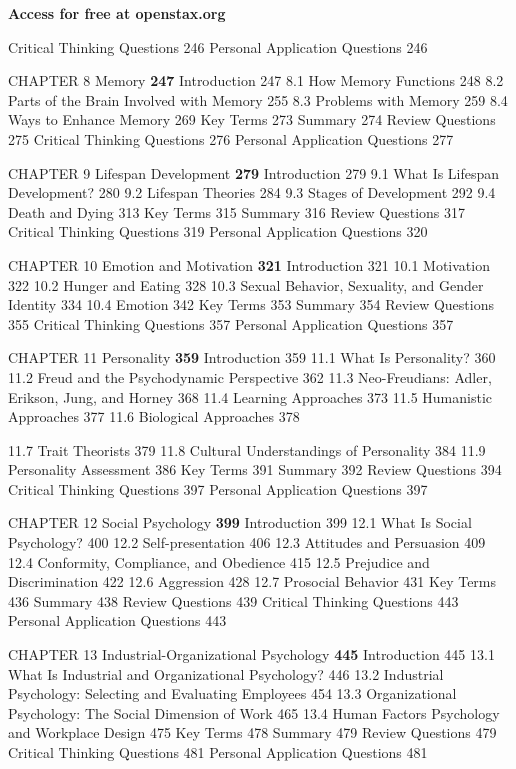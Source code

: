 \documentclass[11pt]{article}
\begin{document}
\textbf{Access for free at openstax.org}



Critical Thinking Questions  246  Personal Application Questions  246

CHAPTER 8  Memory \textbf{247 } Introduction  247  8.1 How Memory Functions  248  8.2 Parts of the Brain Involved with Memory  255  8.3 Problems with Memory  259  8.4 Ways to Enhance Memory  269  Key Terms  273  Summary  274  Review Questions  275  Critical Thinking Questions  276  Personal Application Questions  277

CHAPTER 9  Lifespan Development \textbf{279 } Introduction  279  9.1 What Is Lifespan Development?  280  9.2 Lifespan Theories  284  9.3 Stages of Development  292  9.4 Death and Dying  313  Key Terms  315  Summary  316  Review Questions  317  Critical Thinking Questions  319  Personal Application Questions  320

CHAPTER 10  Emotion and Motivation \textbf{321 } Introduction  321  10.1 Motivation  322  10.2 Hunger and Eating  328  10.3 Sexual Behavior, Sexuality, and Gender Identity  334  10.4 Emotion  342  Key Terms  353  Summary  354  Review Questions  355  Critical Thinking Questions  357  Personal Application Questions  357

CHAPTER 11  Personality \textbf{359 } Introduction  359  11.1 What Is Personality?  360  11.2 Freud and the Psychodynamic Perspective  362  11.3 Neo-Freudians: Adler, Erikson, Jung, and Horney  368  11.4 Learning Approaches  373  11.5 Humanistic Approaches  377  11.6 Biological Approaches  378



11.7 Trait Theorists  379  11.8 Cultural Understandings of Personality  384  11.9 Personality Assessment  386  Key Terms  391  Summary  392  Review Questions  394  Critical Thinking Questions  397  Personal Application Questions  397

CHAPTER 12  Social Psychology \textbf{399 } Introduction  399  12.1 What Is Social Psychology?  400  12.2 Self-presentation  406  12.3 Attitudes and Persuasion  409  12.4 Conformity, Compliance, and Obedience  415  12.5 Prejudice and Discrimination  422  12.6 Aggression  428  12.7 Prosocial Behavior  431  Key Terms  436  Summary  438  Review Questions  439  Critical Thinking Questions  443  Personal Application Questions  443

CHAPTER 13  Industrial-Organizational Psychology \textbf{445 } Introduction  445  13.1 What Is Industrial and Organizational Psychology?  446  13.2 Industrial Psychology: Selecting and Evaluating Employees  454  13.3 Organizational Psychology: The Social Dimension of Work  465  13.4 Human Factors Psychology and Workplace Design  475  Key Terms  478  Summary  479  Review Questions  479  Critical Thinking Questions  481  Personal Application Questions  481
\end{document}
